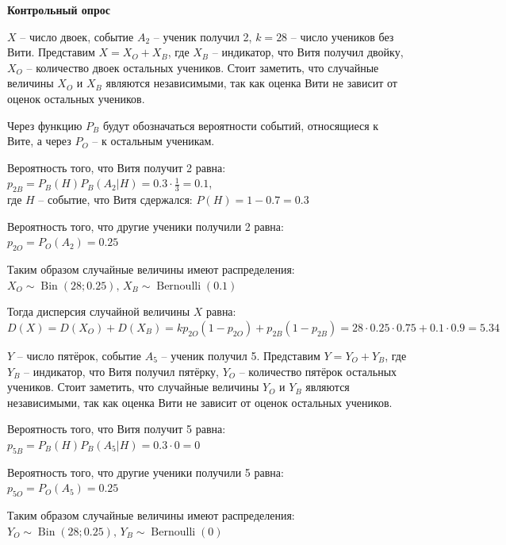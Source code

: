 \documentclass[a4paper,14pt]{extarticle}
\DeclareMathOperator{\Bernoulli}{Bernoulli}
\DeclareMathOperator{\Bin}{Bin}
\begin{document}
    \begin{center}
        \textbf{Контрольный опрос}
    \end{center}

    $X$ -- число двоек, событие $A_2$ -- ученик получил 2, $k = 28$ -- число учеников без Вити.
    Представим $X = X_O + X_B$, где $X_B$ -- индикатор, что Витя получил двойку, $X_O$ -- количество двоек остальных учеников.
    Стоит заметить, что случайные величины $X_O$ и $X_B$ являются независимыми, так как оценка Вити не зависит от оценок остальных учеников.

    Через функцию $P_B$ будут обозначаться вероятности событий, относящиеся к Вите, а через $P_O$ -- к остальным ученикам.
    
    Вероятность того, что Витя получит 2 равна:\\
    $\displaystyle p_{2B}= P_B(H)P_B(A_2|H) = 0.3 \cdot \frac{1}{3} = 0.1$,\\
    где $H$ -- событие, что Витя сдержался: $P(H) = 1 - 0.7 = 0.3$

    Вероятность того, что другие ученики получили 2 равна:\\
    $p_{2O} = P_O(A_2) = 0.25$

    Таким образом случайные величины имеют распределения:\\
    $X_O \sim \Bin(28; 0.25),\, X_B \sim \Bernoulli(0.1)$

    Тогда дисперсия случайной величины $X$ равна:\\
    $D(X) = D(X_O) + D(X_B) = kp_{2O}(1 - p_{2O}) + p_{2B}(1 - p_{2B}) = 28 \cdot 0.25 \cdot 0.75 + 0.1 \cdot 0.9 = 5.34$

    $Y$ -- число пятёрок, событие $A_5$ -- ученик получил 5.
    Представим $Y = Y_O + Y_B$, где $Y_B$ -- индикатор, что Витя получил пятёрку, $Y_O$ -- количество пятёрок остальных учеников.
    Стоит заметить, что случайные величины $Y_O$ и $Y_B$ являются независимыми, так как оценка Вити не зависит от оценок остальных учеников.

    Вероятность того, что Витя получит 5 равна:\\
    $p_{5B}= P_B(H)P_B(A_5|H) = 0.3 \cdot 0 = 0$

    Вероятность того, что другие ученики получили 5 равна:\\
    $p_{5O} = P_O(A_5) = 0.25$

    Таким образом случайные величины имеют распределения:\\
    $Y_O \sim \Bin(28; 0.25),\, Y_B \sim \Bernoulli(0)$
\end{document}
